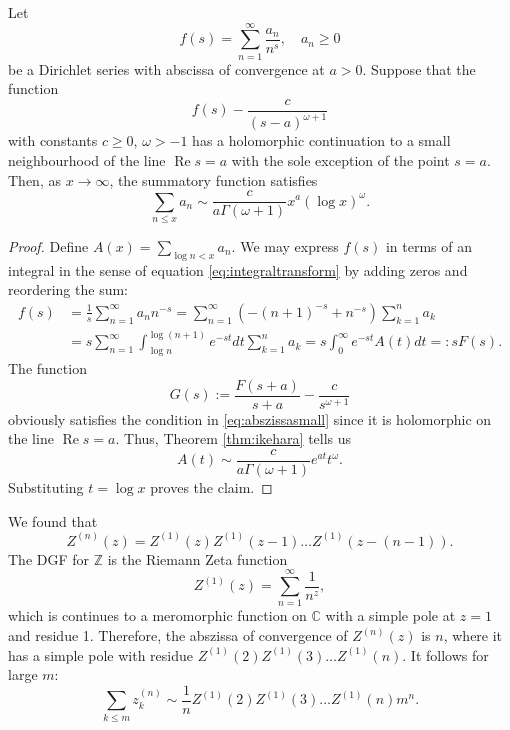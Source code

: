 \begin{thm}
Let
\begin{equation*}
    f(s) = \sum_{n=1}^\infty \frac{a_n}{n^s}, \quad a_n \geq 0
\end{equation*}
be a Dirichlet series with abscissa of convergence at $a > 0$. 
Suppose that the function
\begin{equation*}
    f(s) - \frac{c}{(s-a)^{\omega + 1}}
\end{equation*}
with constants $c \geq 0$, $\omega > -1$ has a holomorphic continuation to a small neighbourhood of the line $\operatorname{Re} s = a$ with the sole exception of the point $s=a$.
Then, as $x \to \infty$, the summatory function satisfies
\begin{equation*}
    \sum_{n \leq x} a_n \sim \frac{c}{a \Gamma(\omega + 1)} x^a (\log x)^\omega.
\end{equation*}
\end{thm}

\begin{proof}
Define $A(x) = \sum_{\log n < x} a_n$. We may express $f(s)$ in terms of an integral in the sense of equation  \eqref{eq:integraltransform} by adding zeros and reordering the sum:
\begin{align*}
    f(s) &= \frac{1}{s} \sum_{n=1}^\infty a_n n^{-s} = \sum_{n=1}^\infty  (-(n+1)^{-s} + n^{-s}) \sum_{k=1}^n a_k \\
    &= s \sum_{n=1}^\infty \int_{\log n}^{\log(n+1)} e^{-st} dt \sum_{k=1}^n a_k
    = s \int_0^\infty e^{-s t} A(t) dt =: s F(s).
\end{align*}
The function
\begin{equation*}
    G(s) := \frac{F(s+a)}{s+a} - \frac{c}{s^{\omega + 1}}
\end{equation*}
obviously satisfies the condition in \eqref{eq:abszissasmall} since it is holomorphic on the line $\operatorname{Re} s = a$.
Thus, Theorem \ref{thm:ikehara} tells us
\begin{equation*}
    A(t) \sim \frac{c}{a \Gamma(\omega + 1)} e^{a t} t^\omega.
\end{equation*}
Substituting $t = \log x$ proves the claim.
\end{proof}



\begin{exm}
We found that
\[
Z^{(n)}(z) = Z^{(1)}(z) Z^{(1)}(z - 1) \ldots Z^{(1)}(z - (n-1)).
\]
The DGF for $\mathbb{Z}$ is the Riemann Zeta function
\[
    Z^{(1)}(z) = \sum_{n=1}^\infty \frac{1}{n^z}, 
\]
which is continues to a meromorphic function on $\mathbb{C}$ with a simple pole at $z=1$ and residue 1.
Therefore, the abszissa of convergence of $Z^{(n)}(z)$ is $n$, where it has a simple pole with residue $Z^{(1)}(2) Z^{(1)}(3) \dots Z^{(1)}(n)$.
It follows for large $m$:
\[
    \sum_{k \leq m} z_k^{(n)} \sim \frac{1}{n} Z^{(1)}(2) Z^{(1)}(3) \dots Z^{(1)}(n) m^n.
\]
\end{exm}
